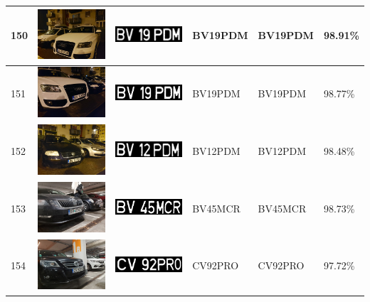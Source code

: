 \documentclass[a4paper,12pt]{report}
\begin{document}
\begin{longtable}{| m{0.6cm} | m{3cm} | m{3cm} | m{1.8cm} | m{1.8cm} | m{1.8cm} |}
        150 & \includegraphics[width=3cm,keepaspectratio]{dataset/88_d1.jpg} & \includegraphics[width=3cm,keepaspectratio]{segmentari/150.jpg} & BV19PDM & BV19PDM & 98.91\% \\ \hline
        151 & \includegraphics[width=3cm,keepaspectratio]{dataset/88_s1.jpg} & \includegraphics[width=3cm,keepaspectratio]{segmentari/151.jpg} & BV19PDM & BV19PDM & 98.77\% \\ \hline
        152 & \includegraphics[width=3cm,keepaspectratio]{dataset/89_s1.jpg} & \includegraphics[width=3cm,keepaspectratio]{segmentari/152.jpg} & BV12PDM & BV12PDM & 98.48\% \\ \hline
        153 & \includegraphics[width=3cm,keepaspectratio]{dataset/90_s1.jpg} & \includegraphics[width=3cm,keepaspectratio]{segmentari/153.jpg} & BV45MCR & BV45MCR & 98.73\% \\ \hline
        154 & \includegraphics[width=3cm,keepaspectratio]{dataset/91_s1.jpg} & \includegraphics[width=3cm,keepaspectratio]{segmentari/154.jpg} & CV92PRO & CV92PRO & 97.72\% \\ \hline

\end{longtable}
\end{document}
